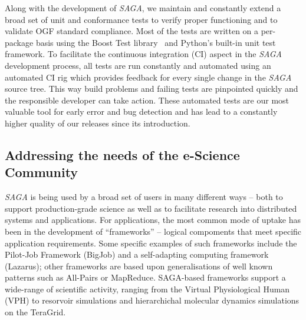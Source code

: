 \documentclass[a4paper,10pt]{article}
\newcommand{\sagaimpl}{\textit{SAGA}\xspace}
\newcommand{\impl}{\sagaimpl}
\newcommand{\note}[1]{ {\textcolor{red} { ***NOTE: #1 }}}
\newcommand{\jhanote}[1]{  {\textcolor{red}     { ***Shantenu: #1 }}}
\newcommand{\jhanote}[1]{}
\begin{document}
 Along with the development of \impl, we maintain and constantly
 extend a broad set of unit and conformance tests to verify proper
 functioning and to validate OGF standard compliance. Most of the
 tests are written on a per-package basis using the Boost Test
 library~\cite{boost_test_web} and Python's built-in unit test
 framework. To facilitate the continuous integration (CI) aspect in
 the \impl development process, all tests are run constantly and
 automated using an automated CI rig\cite{buildbot_web} which provides
 feedback for every single change in the \impl source tree. This way
 build problems and failing tests are pinpointed quickly and the
 responsible developer can take action. These automated tests are  our
 most valuable tool for early error and bug detection and has lead to
 a constantly higher quality of our releases since its introduction.

\vspace{-0.8em}

\subsection*{Addressing the needs of the e-Science Community}
\vspace{-0.5em}

 \impl is being used by a broad set of users in many different ways -- both to
 support production-grade science as well as to facilitate research into
 distributed systems and applications.  For applications, the most common mode
 of uptake has been in the development of ``frameworks'' -- logical compoments
 that meet specific application requirements. Some specific examples of such
 frameworks include the Pilot-Job Framework (BigJob) and a self-adapting
 computing framework (Lazarus); other frameworks are based upon generalisations
 of well known patterns such as All-Pairs or MapReduce.  SAGA-based frameworks
 support a wide-range of scientific activity, ranging from the Virtual
 Physiological Human (VPH) to resorvoir simulations and hierarchichal molecular
 dynamics simulations on the TeraGrid.
\end{document}
